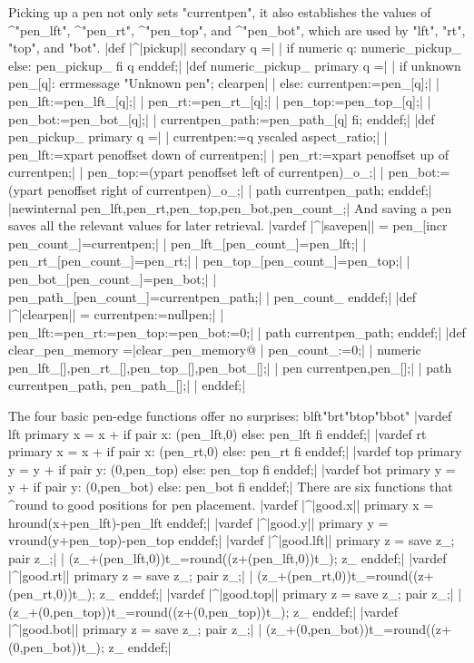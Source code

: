 Picking up a pen not only sets "currentpen", it also establishes
the values of ^"pen\_lft", ^"pen\_rt", ^"pen\_top", and ^"pen\_bot",
which are used by "lft", "rt", "top", and "bot".
\beginlines
|def |^|pickup|| secondary q =|
| if numeric q: numeric_pickup_ else: pen_pickup_ fi q enddef;|
|def numeric_pickup_ primary q =|
| if unknown pen_[q]: errmessage "Unknown pen"; clearpen|
| else: currentpen:=pen_[q];|
|  pen_lft:=pen_lft_[q];|
|  pen_rt:=pen_rt_[q];|
|  pen_top:=pen_top_[q];|
|  pen_bot:=pen_bot_[q];|
|  currentpen_path:=pen_path_[q] fi; enddef;|
|def pen_pickup_ primary q =|
|  currentpen:=q yscaled aspect_ratio;|
|  pen_lft:=xpart penoffset down of currentpen;|
|  pen_rt:=xpart penoffset up of currentpen;|
|  pen_top:=(ypart penoffset left of currentpen)_o_;|
|  pen_bot:=(ypart penoffset right of currentpen)_o_;|
|  path currentpen_path; enddef;|
|newinternal pen_lft,pen_rt,pen_top,pen_bot,pen_count_;|
\endlines
And saving a pen saves all the relevant values for later retrieval.
\beginlines
|vardef |^|savepen|| = pen_[incr pen_count_]=currentpen;|
| pen_lft_[pen_count_]=pen_lft;|
| pen_rt_[pen_count_]=pen_rt;|
| pen_top_[pen_count_]=pen_top;|
| pen_bot_[pen_count_]=pen_bot;|
| pen_path_[pen_count_]=currentpen_path;|
| pen_count_ enddef;|
\smallbreak
|def |^|clearpen|| = currentpen:=nullpen;|
| pen_lft:=pen_rt:=pen_top:=pen_bot:=0;|
| path currentpen_path; enddef;|
\smallbreak
|def clear_pen_memory =|^^@clear\_pen\_memory@
| pen_count_:=0;|
| numeric pen_lft_[],pen_rt_[],pen_top_[],pen_bot_[];|
| pen currentpen,pen_[];|
| path currentpen_path, pen_path_[];|
| enddef;|
\endlines

The four basic pen-edge functions offer no surprises:
^^"lft"^^"rt"^^"top"^^"bot"
\beginlines
|vardef lft primary x = x + if pair x: (pen_lft,0) else: pen_lft fi enddef;|
|vardef rt primary x = x + if pair x: (pen_rt,0) else: pen_rt fi enddef;|
|vardef top primary y = y + if pair y: (0,pen_top) else: pen_top fi enddef;|
|vardef bot primary y = y + if pair y: (0,pen_bot) else: pen_bot fi enddef;|
\endlines
There are six functions that ^{round} to good positions for pen placement.
\beginlines
|vardef |^|good.x|| primary x = hround(x+pen_lft)-pen_lft enddef;|
|vardef |^|good.y|| primary y = vround(y+pen_top)-pen_top enddef;|
|vardef |^|good.lft|| primary z = save z_; pair z_;|
|  (z_+(pen_lft,0))t_=round((z+(pen_lft,0))t_); z_ enddef;|
|vardef |^|good.rt|| primary z = save z_; pair z_;|
|  (z_+(pen_rt,0))t_=round((z+(pen_rt,0))t_); z_ enddef;|
|vardef |^|good.top|| primary z = save z_; pair z_;|
|  (z_+(0,pen_top))t_=round((z+(0,pen_top))t_); z_ enddef;|
|vardef |^|good.bot|| primary z = save z_; pair z_;|
|  (z_+(0,pen_bot))t_=round((z+(0,pen_bot))t_); z_ enddef;|
\endlines

